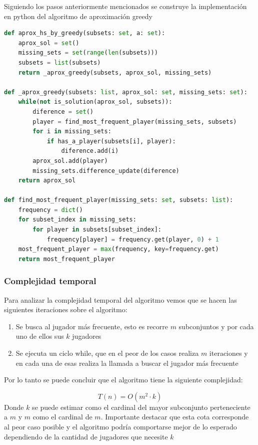 Siguiendo los pasos anteriormente mencionados se construye la implementación en python del algoritmo de aproximación greedy 

\begin{lstlisting}[language=Python, caption= aproximación greedy, label=python_code]
def aprox_hs_by_greedy(subsets: set, a: set):
    aprox_sol = set()
    missing_sets = set(range(len(subsets)))
    subsets = list(subsets)
    return _aprox_greedy(subsets, aprox_sol, missing_sets)

def _aprox_greedy(subsets: list, aprox_sol: set, missing_sets: set):
    while(not is_solution(aprox_sol, subsets)):
        diference = set()
        player = find_most_frequent_player(missing_sets, subsets)
        for i in missing_sets: 
            if has_a_player(subsets[i], player):
                diference.add(i)
        aprox_sol.add(player)
        missing_sets.difference_update(diference)
    return aprox_sol

def find_most_frequent_player(missing_sets: set, subsets: list):
    frequency = dict()
    for subset_index in missing_sets:
        for player in subsets[subset_index]:
            frequency[player] = frequency.get(player, 0) + 1
    most_frequent_player = max(frequency, key=frequency.get)
    return most_frequent_player
\end{lstlisting}

\subsubsection{Complejidad temporal}

Para analizar la complejidad temporal del algoritmo vemos que se hacen las siguientes iteraciones sobre el algoritmo: 

\begin{enumerate}
    \item Se busca al jugador más frecuente, esto es recorre $m$ subconjuntos y por cada uno de ellos sus $k$ jugadores\\
    \item Se ejecuta un ciclo while, que en el peor de los casos realiza $m$ iteraciones y en cada una de esas realiza la llamada a buscar el jugador más frecuente
\end{enumerate}

Por lo tanto se puede concluir que el algoritmo tiene la siguiente complejidad:

$$
    T(n) = O(m^2 \cdot k)
$$
Donde $k$ se puede estimar como el cardinal del mayor subconjunto perteneciente a $m$ y $m$ como el cardinal de $m$. Importante destacar que esta cota corresponde al peor caso posible y el algoritmo podría comportarse mejor de lo esperado dependiendo de la cantidad de jugadores que necesite $k$

